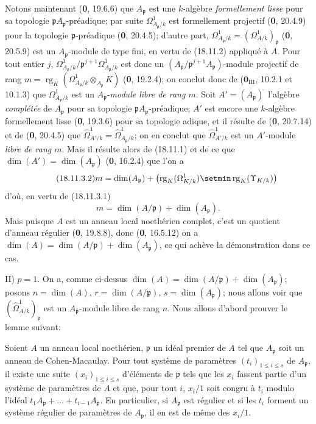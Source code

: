 Notons maintenant (\textbf{0}, 19.6.6) que $A_{\mathfrak p}$ est une $k$-algèbre \emph{formellement lisse} pour sa topologie $\mathfrak pA_{\mathfrak p}$-préadique; par suite $\Omega^1_{A_{\mathfrak p}/k}$ est formellement projectif (\textbf{0}, 20.4.9) pour la topologie $\mathfrak p$-préadique (\textbf{0}, 20.4.5); d'autre part, $\Omega^1_{A_{\mathfrak p}/k}=(\Omega^1_{A/k})_{\mathfrak p}$ (\textbf{0}, 20.5.9) est un $A_{\mathfrak p}$-module de type fini, en vertu de (18.11.2) appliqué à $A$. Pour tout entier $j$, $\Omega^1_{A_{\mathfrak p}/k}/\mathfrak p^{j+1}\Omega^1_{A_{\mathfrak p}/k}$ est donc un $(A_{\mathfrak p}/\mathfrak p^{j+1}A_{\mathfrak p})$-module projectif de rang $m=\operatorname{rg}_K(\Omega^1_{A_{\mathfrak p}/k}\otimes_{A_{\mathfrak p}}K)$ (\textbf{0}, 19.2.4); on conclut donc de ($\mathbf{0}_{\mathrm{III}}$, 10.2.1 et 10.1.3) que $\Omega^1_{A_{\mathfrak p}/k}$ est un $A_{\mathfrak p}$-\emph{module libre de rang $m$}. Soit $A'=(A_{\mathfrak p})^{\widehat{\,}}$ l'algèbre \emph{complétée} de $A_{\mathfrak p}$ pour sa topologie $\mathfrak pA_{\mathfrak p}$-préadique; $A'$ est encore une $k$-algèbre formellement lisse (\textbf{0}, 19.3.6) pour sa topologie adique, et il résulte de (\textbf{0}, 20.7.14) et de (\textbf{0}, 20.4.5) que $\hat{\Omega}^1_{A'/k}=\hat{\Omega}^1_{A_{\mathfrak p}/k}$; on en conclut que $\hat{\Omega}^1_{A'/k}$ est un $A'$-module \emph{libre de rang $m$}. Mais il résulte alors de (18.11.1) et de ce que $\dim(A')=\dim(A_{\mathfrak p})$ (\textbf{0}, 16.2.4) que l'on a
\begin{equation}
\label{IV.18.11.3.2}
\tag{18.11.3.2}
  m=\dim(A_{\mathfrak p})+
  \bigl(\operatorname{rg}_K(\Omega^1_{K/k})\setmin\operatorname{rg}_K(\Upsilon_{K/k})\bigr)
\end{equation}
d'où, en vertu de (18.11.3.1)
\[
  m=\dim(A/\mathfrak p)+\dim(A_{\mathfrak p}).
\]
Mais puisque $A$ est un anneau local noethérien complet, c'est un quotient d'anneau régulier (\textbf{0}, 19.8.8), donc (\textbf{0}, 16.5.12) on a $\dim(A)=\dim(A/\mathfrak p)+\dim(A_{\mathfrak p})$, ce qui achève la démonstration dans ce cas.

II) $p=1$. On a, comme ci-dessus $\dim(A)=\dim(A/\mathfrak p)+\dim(A_{\mathfrak p})$; posons $n=\dim(A)$, $r=\dim(A/\mathfrak p)$, $s=\dim(A_{\mathfrak p})$; nous allons voir que $(\hat{\Omega}^1_{A/k})_{\mathfrak p}$ est un $A_{\mathfrak p}$-module libre de rang $n$. Nous allons d'abord prouver le lemme suivant:

\begin{lemma}[18.11.3.3]
\label{IV.18.11.3.3}
Soient $A$ un anneau local noethérien, $\mathfrak p$ un idéal premier de $A$ tel que $A_{\mathfrak p}$ soit un anneau de Cohen-Macaulay. Pour tout système de paramètres $(t_i)_{1\leq i\leq s}$ de $A_{\mathfrak p}$, il existe une suite $(x_i)_{1\leq i\leq s}$ d'éléments de $\mathfrak p$ tels que les $x_i$ fassent partie d'un système de paramètres de $A$
et que, pour tout $i$, $x_i/1$ soit congru à $t_i$ modulo l'idéal $t_1A_{\mathfrak p}+\ldots+t_{i-1}A_{\mathfrak p}$. En particulier, si $A_{\mathfrak p}$ est régulier et si les $t_i$ forment un système \textup{régulier} de paramètres de $A_{\mathfrak p}$, il en est de même des $x_i/1$.
\end{lemma}

